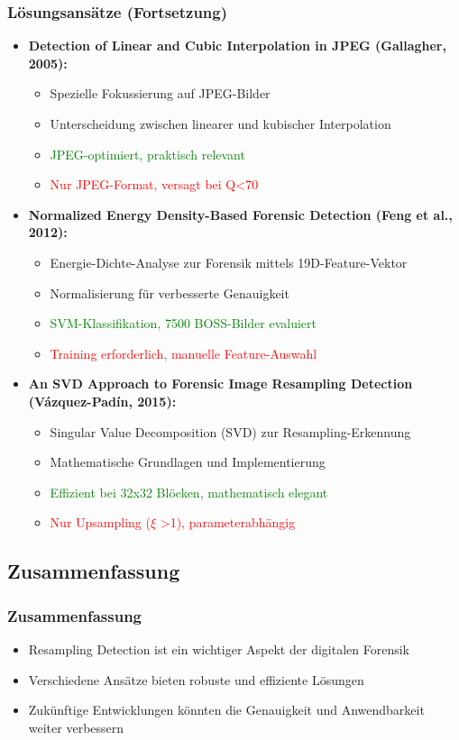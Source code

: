 \documentclass[11pt,t,usepdftitle=false,aspectratio=169]{beamer}
\begin{document}
\begin{frame}
	\frametitle{Lösungsansätze (Fortsetzung)}
	\begin{itemize}
		\item \textbf{Detection of Linear and Cubic Interpolation in JPEG (Gallagher, 2005):} 
		\begin{itemize}
			\item Spezielle Fokussierung auf JPEG-Bilder
			\item Unterscheidung zwischen linearer und kubischer Interpolation
			\item \textcolor{green}{JPEG-optimiert, praktisch relevant}
			\item \textcolor{red}{Nur JPEG-Format, versagt bei Q<70}
		\end{itemize}
		\item \textbf{Normalized Energy Density-Based Forensic Detection (Feng et al., 2012):} 
		\begin{itemize}
			\item Energie-Dichte-Analyse zur Forensik mittels 19D-Feature-Vektor
			\item Normalisierung für verbesserte Genauigkeit
			\item \textcolor{green}{SVM-Klassifikation, 7500 BOSS-Bilder evaluiert}
			\item \textcolor{red}{Training erforderlich, manuelle Feature-Auswahl}
		\end{itemize}
		\item \textbf{An SVD Approach to Forensic Image Resampling Detection (Vázquez-Padín, 2015):} 
		\begin{itemize}
			\item Singular Value Decomposition (SVD) zur Resampling-Erkennung
			\item Mathematische Grundlagen und Implementierung
			\item \textcolor{green}{Effizient bei 32x32 Blöcken, mathematisch elegant}
			\item \textcolor{red}{Nur Upsampling ($\xi$ >1), parameterabhängig}
		\end{itemize}
	\end{itemize}
\end{frame}


\subsection{Zusammenfassung}

\begin{frame}
	\frametitle{Zusammenfassung}
	\begin{itemize}
		\item Resampling Detection ist ein wichtiger Aspekt der digitalen Forensik
		\item Verschiedene Ansätze bieten robuste und effiziente Lösungen
		\item Zukünftige Entwicklungen könnten die Genauigkeit und Anwendbarkeit weiter verbessern
	\end{itemize}
\end{frame}
\end{document}
